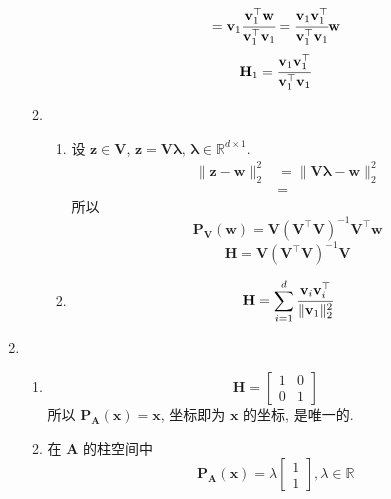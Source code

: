 \documentclass[11pt,letter,notitlepage]{article}
\newcommand{\proj}[2]{\textbf{P}_{#2} (#1)}
\begin{document}
\begin{solution}
\begin{enumerate}
\begin{enumerate}
$$                            =\mathbf{v}_1\cfrac{\mathbf{v}_1^\top\mathbf{w}}{\mathbf{v}_1^\top\mathbf{v}_1}
                            =\cfrac{\mathbf{v}_1\mathbf{v}_1^\top}{\mathbf{v}_1^\top\mathbf{v}_1}\mathbf{w}$$
                        $$\mathbf{H}_1=\cfrac{\mathbf{v}_1\mathbf{v}_1^\top}{\mathbf{v}_1^\top\mathbf{v}_1}$$
                  \item \begin{enumerate}
                            \item 设 $\mathbf{z}\in\mathbf{V}$, $\mathbf{z}=\mathbf{V}\mathbf{\lambda}$, $\mathbf{\lambda}\in\mathbb{R}^{d\times 1}$.
                                  $$\begin{aligned}
                                          \|\mathbf{z}-\mathbf{w}\|_2^2
                                           & =\|\mathbf{V}\mathbf{\lambda}-\mathbf{w}\|_2^2 \\
                                           & =
                                      \end{aligned}$$
                                  所以 $$\proj{\mathbf{w}}{\mathbf{V}}=\mathbf{V}\left(\mathbf{V}^\top\mathbf{V}\right)^{-1}\mathbf{V}^\top\mathbf{w}$$
                                  $$\mathbf{H}=\mathbf{V}\left(\mathbf{V}^\top\mathbf{V}\right)^{-1}\mathbf{V}$$
                            \item $$\mathbf{H}=\sum_{i=1}^d \cfrac{\mathbf{v}_i\mathbf{v}_i^\top}{\|\mathbf{v}_1\|_2^2}$$
                        \end{enumerate}
              \end{enumerate}
        \item \begin{enumerate}
                  \item $$\mathbf{H}=\begin{bmatrix}
                                1 & 0 \\0&1
                            \end{bmatrix}$$
                        所以 $\proj{\mathbf{x}}{\mathbf{A}}=\mathbf{x}$, 坐标即为 $\mathbf{x}$ 的坐标, 是唯一的.
                  \item 在 $\mathbf{A}$ 的柱空间中
                        $$\proj{\mathbf{x}}{\mathbf{A}}=\lambda\begin{bmatrix}
                                1 \\1
                            \end{bmatrix},\lambda\in\mathbb{R}$$

\end{enumerate}
\end{enumerate}
\end{solution}
\end{document}

